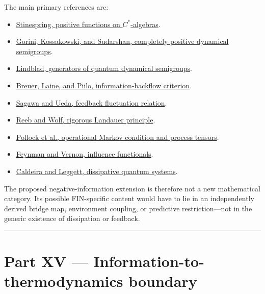 \documentclass[11pt,a4paper,openany]{report}
\begin{document}
The main primary references are:

\begin{itemize}
\item 
\href{https://doi.org/10.1090/S0002-9939-1955-0069403-4}{Stinespring, positive functions on \(C^*\)-algebras}.

\item 
\href{https://doi.org/10.1063/1.522979}{Gorini, Kossakowski, and Sudarshan, completely positive dynamical semigroups}.

\item 
\href{https://doi.org/10.1007/BF01608499}{Lindblad, generators of quantum dynamical semigroups}.

\item 
\href{https://doi.org/10.1103/PhysRevLett.103.210401}{Breuer, Laine, and Piilo, information-backflow criterion}.

\item 
\href{https://doi.org/10.1103/PhysRevLett.104.090602}{Sagawa and Ueda, feedback fluctuation relation}.

\item 
\href{https://doi.org/10.1088/1367-2630/16/10/103011}{Reeb and Wolf, rigorous Landauer principle}.

\item 
\href{https://doi.org/10.1103/PhysRevLett.120.040405}{Pollock et al., operational Markov condition and process tensors}.

\item 
\href{https://doi.org/10.1016/0003-4916(63)90068-X}{Feynman and Vernon, influence functionals}.

\item 
\href{https://doi.org/10.1016/0003-4916(83)90202-6}{Caldeira and Leggett, dissipative quantum systems}.

\end{itemize}

The proposed negative-information extension is therefore not a new mathematical category. Its possible FIN-specific content would have to lie in an independently derived bridge map, environment coupling, or predictive restriction—not in the generic existence of dissipation or feedback.

\par\medskip\hrule\medskip

\chapter{Part XV — Information-to-thermodynamics boundary}
\end{document}
